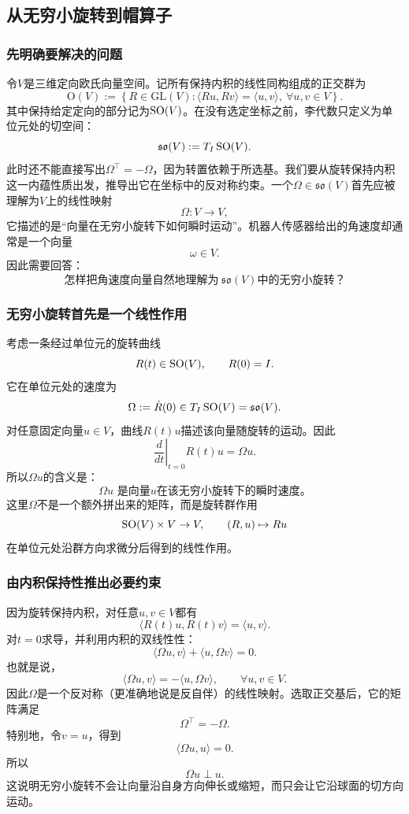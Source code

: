 \subsection{从无穷小旋转到帽算子}

\subsubsection*{先明确要解决的问题}

令$V$是三维定向欧氏向量空间。记所有保持内积的线性同构组成的正交群为
\[
    \mathrm O(V)
    :=
    \left\{
    R\in\mathrm{GL}(V):
    \langle Ru,Rv\rangle=\langle u,v\rangle,\ 
    \forall u,v\in V
    \right\}.
\]
其中保持给定定向的部分记为$\operatorname{SO}(V)$。在没有选定坐标之前，李代数只定义为单位元处的切空间：
\[
    \mathfrak{so}(V):=T_I\operatorname{SO}(V).
\]
此时还不能直接写出$\Omega^\top=-\Omega$，因为转置依赖于所选基。我们要从旋转保持内积这一内蕴性质出发，推导出它在坐标中的反对称约束。一个$\Omega\in\mathfrak{so}(V)$首先应被理解为$V$上的线性映射
\[
    \Omega:V\to V,
\]
它描述的是“向量在无穷小旋转下如何瞬时运动”。机器人传感器给出的角速度却通常是一个向量
\[
    \omega\in V.
\]
因此需要回答：
\[
    \boxed{
    \text{怎样把角速度向量自然地理解为}\ \mathfrak{so}(V)\text{中的无穷小旋转？}
    }
\]

\subsubsection*{无穷小旋转首先是一个线性作用}

考虑一条经过单位元的旋转曲线
\[
    R(t)\in\operatorname{SO}(V),
    \qquad
    R(0)=I.
\]
它在单位元处的速度为
\[
    \Omega:=\dot R(0)\in T_I\operatorname{SO}(V)=\mathfrak{so}(V).
\]
对任意固定向量$u\in V$，曲线$R(t)u$描述该向量随旋转的运动。因此
\[
    \left.\frac{d}{dt}\right|_{t=0}R(t)u
    =\Omega u.
\]
所以$\Omega u$的含义是：
\[
    \boxed{
    \Omega u\text{ 是向量}u\text{在该无穷小旋转下的瞬时速度。}
    }
\]
这里$\Omega$不是一个额外拼出来的矩阵，而是旋转群作用
\[
    \operatorname{SO}(V)\times V\to V,
    \qquad
    (R,u)\mapsto Ru
\]
在单位元处沿群方向求微分后得到的线性作用。

\subsubsection*{由内积保持性推出必要约束}

因为旋转保持内积，对任意$u,v\in V$都有
\[
    \langle R(t)u,R(t)v\rangle
    =\langle u,v\rangle.
\]
对$t=0$求导，并利用内积的双线性性：
\[
    \langle\Omega u,v\rangle
    +\langle u,\Omega v\rangle
    =0.
\]
也就是说，
\[
    \boxed{
    \langle\Omega u,v\rangle
    =-\langle u,\Omega v\rangle,
    \qquad\forall u,v\in V.
    }
\]
因此$\Omega$是一个反对称（更准确地说是反自伴）的线性映射。选取正交基后，它的矩阵满足
\[
    \Omega^\top=-\Omega.
\]
特别地，令$v=u$，得到
\[
    \langle\Omega u,u\rangle=0.
\]
所以
\[
    \boxed{
    \Omega u\perp u.
    }
\]
这说明无穷小旋转不会让向量沿自身方向伸长或缩短，而只会让它沿球面的切方向运动。


